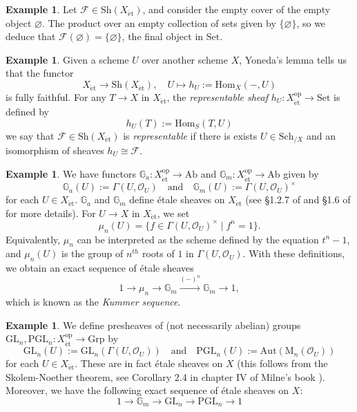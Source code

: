\documentclass{article}
\def\~#1{\mathscr{#1}}
\def\To#1{\xrightarrow{#1}}
\numberwithin{equation}{section}
\numberwithin{figure}{section}
\newcommand{\G}{\mathbb{G}}
\newcommand{\Hom}{\mathrm{Hom}}
\newcommand{\Aut}{\mathrm{Aut}}
\newcommand{\GL}{\mathrm{GL}}
\newcommand{\PGL}{\mathrm{PGL}}
\newcommand{\M}{\mathrm{M}}
\newcommand{\op}{\mathrm{op}}
\newcommand{\et}{\acute{\mathrm{e}}\mathrm{t}}
\newcommand{\Set}{\mathrm{Set}}
\newcommand{\Grp}{\mathrm{Grp}}
\newcommand{\Ab}{\mathrm{Ab}}
\newcommand{\Sh}{\mathrm{Sh}}
\newcommand{\Sch}{\mathrm{Sch}}
\theoremstyle{plain}
\theoremstyle{definition}
\newtheorem{ex}[thm]{Example}
\theoremstyle{remark}
\begin{document}
\begin{ex}
    Let $\~F \in \Sh(X_{\et})$, and consider the empty cover of the empty object $\varnothing$. The product over an empty collection of sets given by $\{\varnothing\}$, so we deduce that $\~F(\varnothing) = \{\varnothing\}$, the final object in $\Set$.
\end{ex}

\begin{ex}
    Given a scheme $U$ over another scheme $X$, Yoneda's lemma tells us that the functor 
    \[X_{\et} \to \Sh(X_{\et}), \quad U \mapsto h_U := \Hom_X(-, U)\]
    is fully faithful. For any $T \to X$ in $X_{\et}$, the \emph{representable sheaf} $h_U: X_{\et}^\op \to \Set$ is defined by 
        \[h_U(T) := \Hom_{S}(T,U)\]
    we say that $\~F \in \Sh(X_{\et})$ is \emph{representable} if there is exists $U \in \Sch_{/X}$ and an isomorphism of sheaves $h_U \cong \~F$. 
\end{ex}

\begin{ex}
    We have functors $\G_a: X_{\et}^\op \to \Ab$ and $\G_m: X_{\et}^\op \to \Ab$ given by
    \[\G_a(U) := \Gamma(U, \~O_U) \quad \text{and} \quad \G_m(U) := \Gamma(U, \~O_U)^\times\]
    for each $U \in X_{\et}$. $\G_a$ and $\G_m$ define \'etale sheaves on $X_{\et}$ (see \S1.2.7 of \cite{conrad} and \S1.6 of \cite{milne} for more details). For $U \to X$ in $X_{\et}$, we set
    \[\mu_n(U) = \{ f \in \Gamma(U, \~{O}_U)^\times \mid f^n = 1\}.\]
    Equivalently, $\mu_n$ can be interpreted as the scheme defined by the equation $t^n - 1$, and $\mu_n(U)$ is the group of $n^{th}$ roots of $1$ in $\Gamma(U, \~O_U)$. 
    With these definitions, we obtain an exact sequence of \'etale sheaves
    \[1 \to \mu_n \to \G_m \To{(-)^n} \G_m \to 1,\]
    which is known as the \emph{Kummer sequence}.
\end{ex}

\begin{ex}
    We define presheaves of (not necessarily abelian) groups $\GL_n, \PGL_n: X_{\et}^\op \to \Grp$ by
    \[\GL_n(U) := \GL_n(\Gamma(U,\~O_U)) \quad \text{and} \quad \PGL_n(U) := \Aut\left(\M_n(\~O_U)\right)\]
    for each $U \in X_{\et}$. These are in fact \'etale sheaves on $X$ (this follows from the Skolem-Noether theorem, see Corollary 2.4 in chapter IV of Milne's book \cite{milne_etalebook}). Moreover, we have the following exact sequence of \'etale sheaves on $X$:
    \[1 \to \G_m \to \GL_n \to \PGL_n \to 1\]
\end{ex}
\end{document}
